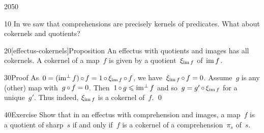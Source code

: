 \begin{parsec}{2050}%
\begin{point}{10}%
In  we saw that comprehensions
    are precisely kernels of predicates.
What about cokernels and quotients?
\end{point}
\begin{point}{20}[effectus-cokernels]{Proposition}%
An effectus with quotients and images has all cokernels.
A cokernel of a map~$f$
    is given by a quotient~$\xi_{\operatorname{im} f}$ of~$\operatorname{im} f$.
\begin{point}{30}{Proof}%
As~$0 = (\operatorname{im^\perp} f) \mathop{\circ} f = 1 \mathop{\circ} \xi_{\operatorname{im} f} \mathop{\circ} f$,
        we have~$\xi_{\operatorname{im} f} \mathop{\circ} f = 0$.
    Assume~$g$ is any (other) map with~$g \mathop{\circ} f = 0$.
Then~$1 \mathop{\circ} g \leqslant \operatorname{im^\perp} f$
    and so~$g = g' \mathop{\circ} \xi_{\operatorname{im} f}$
    for a unique~$g'$.
Thus indeed, $\xi_{\operatorname{im} f}$ is a cokernel of~$f$. \qed
\end{point}
\end{point}
\begin{point}{40}{Exercise}%
Show that in an effectus with comprehension and images,
    a map~$f$ is a quotient of sharp~$s$
    if and only if~$f$ is a cokernel
    of a comprehension~$\pi_s$ of~$s$.
\end{point}
\end{parsec}

